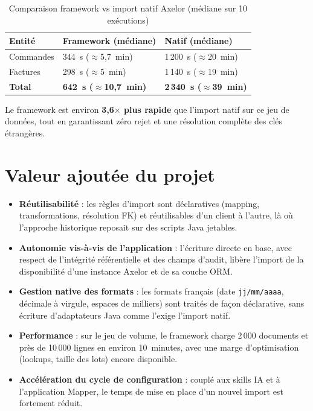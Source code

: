 \begin{table}[H]
  \centering
  \renewcommand{\arraystretch}{1.4}
  \begin{tabular}{p{4cm} p{4cm} p{4cm}}
    \toprule
    \rowcolor{gray!20}
    \textbf{Entité} & \textbf{Framework (médiane)} & \textbf{Natif (médiane)} \\
    \midrule
    \rowcolor{gray!5}
    Commandes & 344~s ($\approx$5,7~min) & 1\,200~s ($\approx$20~min) \\
    Factures  & 298~s ($\approx$5~min)   & 1\,140~s ($\approx$19~min) \\
    \rowcolor{gray!5}
    \textbf{Total} & \textbf{642~s ($\approx$10,7~min)} & \textbf{2\,340~s ($\approx$39~min)} \\
    \bottomrule
  \end{tabular}
  \caption{Comparaison framework vs import natif Axelor (médiane sur 10 exécutions)}
  \label{tab:perf-comparaison}
\end{table}

Le framework est environ \textbf{3,6$\times$ plus rapide} que l'import natif sur ce jeu de données, tout en garantissant zéro rejet et une résolution complète des clés étrangères.


\section{Valeur ajoutée du projet}

\begin{itemize}
    \item \textbf{Réutilisabilité} : les règles d'import sont déclaratives (mapping, transformations, résolution FK) et réutilisables d'un client à l'autre, là où l'approche historique reposait sur des scripts Java jetables.
    \item \textbf{Autonomie vis-à-vis de l'application} : l'écriture directe en base, avec respect de l'intégrité référentielle et des champs d'audit, libère l'import de la disponibilité d'une instance Axelor et de sa couche ORM.
    \item \textbf{Gestion native des formats} : les formats français (date \texttt{jj/mm/aaaa}, décimale à virgule, espaces de milliers) sont traités de façon déclarative, sans écriture d'adaptateurs Java comme l'exige l'import natif.
    \item \textbf{Performance} : sur le jeu de volume, le framework charge 2\,000 documents et près de 10\,000 lignes en environ 10~minutes, avec une marge d'optimisation (lookups, taille des lots) encore disponible.
    \item \textbf{Accélération du cycle de configuration} : couplé aux skills IA et à l'application Mapper, le temps de mise en place d'un nouvel import est fortement réduit.
\end{itemize}

